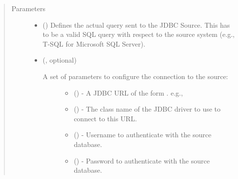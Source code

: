 \documentclass[a4paper,10pt, twoside,english]{sphinxmanual}
\begin{document}
\begin{fulllineitems}
\begin{sphinxVerbatim}[commandchars=\\\{\}]
  
\end{sphinxVerbatim}
\begin{quote}\begin{description}
\item[{Parameters}] \leavevmode\begin{itemize}
\item {} 
 () \textendash{} Defines the actual query sent to the JDBC Source. This has to be a valid SQL query
with respect to the source system (e.g., T-SQL for Microsoft SQL Server).

\item {} 
 (, optional) \textendash{} \begin{description}
\item[{A set of parameters to configure the connection to the source:}] \leavevmode\begin{itemize}
\item {} 
 () - A JDBC URL of the form .
e.g., 

\item {} 
 () - The class name of the JDBC driver to use to connect to this URL.

\item {} 
 () - Username to authenticate with the source database.

\item {} 
 () - Password to authenticate with the source database.


\end{itemize}
\end{description}
\end{itemize}
\end{description}
\end{quote}
\end{fulllineitems}
\end{document}
